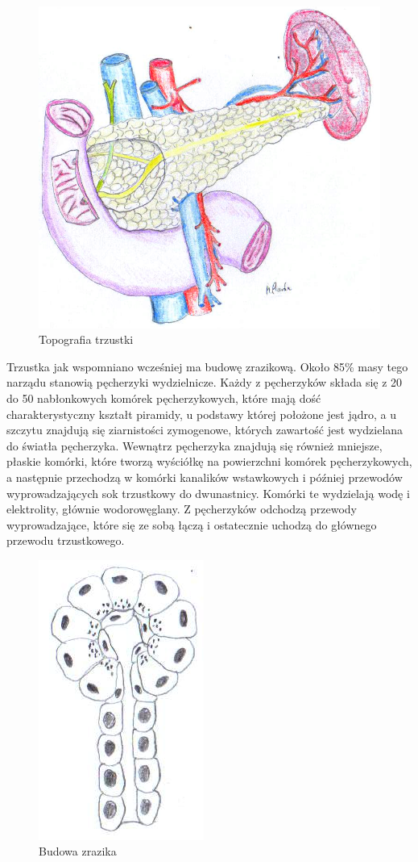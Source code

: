 \documentclass[a4paper, 12pt]{report}
\begin{document}
\begin{figure}[h!]
\centering
\includegraphics[scale=0.28]{pancreas}
\caption{Topografia trzustki}
\end{figure}

Trzustka jak wspomniano wcześniej ma budowę zrazikową. Około 85\%
masy tego narządu stanowią pęcherzyki wydzielnicze. Każdy z
pęcherzyków składa się z 20 do 50 nabłonkowych komórek pęcherzykowych,
które mają dość charakterystyczny kształt piramidy, u podstawy której
położone jest jądro, a u szczytu znajdują się ziarnistości zymogenowe,
których zawartość jest wydzielana do światła pęcherzyka. Wewnątrz
pęcherzyka znajdują się również mniejsze, płaskie komórki, które
tworzą wyściółkę na powierzchni komórek pęcherzykowych, a następnie
przechodzą w komórki kanalików wstawkowych i później przewodów
wyprowadzających sok trzustkowy do dwunastnicy. Komórki te wydzielają
wodę i elektrolity, głównie wodorowęglany. Z pęcherzyków odchodzą
przewody wyprowadzające, które się ze sobą łączą i ostatecznie uchodzą
do głównego przewodu trzustkowego.

\begin{figure}[h!]
\centering
\includegraphics[scale=0.3]{zrazik}
\caption{Budowa zrazika}
\end{figure}
\end{document}
